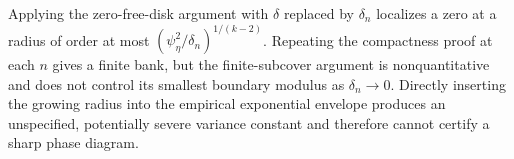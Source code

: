 Applying the zero-free-disk argument with \(\delta\) replaced by \(\delta_n\) localizes a zero at a radius of order at most \((\psi_{\eta}^2/\delta_n)^{1/(k-2)}\).  Repeating the compactness proof at each \(n\) gives a finite bank, but the finite-subcover argument is nonquantitative and does not control its smallest boundary modulus as \(\delta_n\to0\).  Directly inserting the growing radius into the empirical exponential envelope produces an unspecified, potentially severe variance constant and therefore cannot certify a sharp phase diagram.